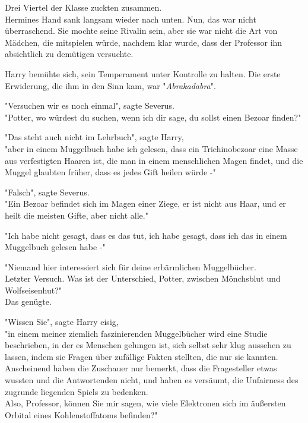 {Drei Viertel der Klasse zuckten zusammen.\\ Hermines Hand sank langsam wieder nach unten. Nun, das war nicht überraschend. Sie mochte seine Rivalin sein, aber sie war nicht die Art von Mädchen, die mitspielen würde, nachdem klar wurde, dass der Professor ihn absichtlich zu demütigen versuchte.

Harry bemühte sich, sein Temperament unter Kontrolle zu halten. Die erste Erwiderung, die ihm in den Sinn kam, war "\emph{Abrakadabra}".

"Versuchen wir es noch einmal", sagte Severus.\\ "Potter, wo würdest du suchen, wenn ich dir sage, du sollst einen Bezoar finden?"

"Das steht auch nicht im Lehrbuch", sagte Harry,\\ "aber in einem Muggelbuch habe ich gelesen, dass ein Trichinobezoar eine Masse aus verfestigten Haaren ist, die man in einem menschlichen Magen findet, und die Muggel glaubten früher, dass es jedes Gift heilen würde -"

"Falsch", sagte Severus.\\ "Ein Bezoar befindet sich im Magen einer Ziege, er ist nicht aus Haar, und er heilt die meisten Gifte, aber nicht alle."

"Ich habe nicht gesagt, dass es das tut, ich habe gesagt, dass ich das in einem Muggelbuch gelesen habe -"

"Niemand hier interessiert sich für deine erbärmlichen Muggelbücher.\\ Letzter Versuch. Was ist der Unterschied, Potter, zwischen Mönchsblut und Wolfseisenhut?"\\ Das genügte.

"Wissen Sie", sagte Harry eisig,\\ "in einem meiner ziemlich faszinierenden Muggelbücher wird eine Studie beschrieben, in der es Menschen gelungen ist, sich selbst sehr klug aussehen zu lassen, indem sie Fragen über zufällige Fakten stellten, die nur sie kannten.\\ Anscheinend haben die Zuschauer nur bemerkt, dass die Fragesteller etwas wussten und die Antwortenden nicht, und haben es versäumt, die Unfairness des zugrunde liegenden Spiels zu bedenken.\\ Also, Professor, können Sie mir sagen, wie viele Elektronen sich im äußersten Orbital eines Kohlenstoffatoms befinden?"

}
